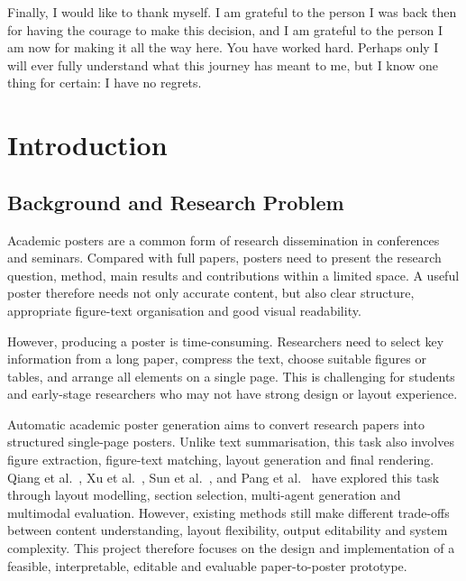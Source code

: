 \documentclass[12pt,oneside]{report}
\begin{document}
\vspace{1em}

Finally, I would like to thank myself. I am grateful to the person I was back then for having the courage to make this decision, and I am grateful to the person I am now for making it all the way here. You have worked hard. Perhaps only I will ever fully understand what this journey has meant to me, but I know one thing for certain: I have no regrets.


\clearpage{\pagestyle{empty}\cleardoublepage}
\tableofcontents

\clearpage{\pagestyle{empty}\cleardoublepage}
\setcounter{page}{1}
\fancyhead[LE,RO]{\slshape \rightmark}
\fancyhead[LO,RE]{\sffamily\textbf{\thepage}}

\chapter{Introduction}

\section{Background and Research Problem}

Academic posters are a common form of research dissemination in conferences and seminars. Compared with full papers, posters need to present the research question, method, main results and contributions within a limited space. A useful poster therefore needs not only accurate content, but also clear structure, appropriate figure-text organisation and good visual readability.

\vspace{1em}

However, producing a poster is time-consuming. Researchers need to select key information from a long paper, compress the text, choose suitable figures or tables, and arrange all elements on a single page. This is challenging for students and early-stage researchers who may not have strong design or layout experience.

\vspace{1em}

Automatic academic poster generation aims to convert research papers into structured single-page posters. Unlike text summarisation, this task also involves figure extraction, figure-text matching, layout generation and final rendering. Qiang et al.~\cite{poster2016}, Xu et al.~\cite{posterbot}, Sun et al.~\cite{p2p}, and Pang et al.~\cite{paper2poster} have explored this task through layout modelling, section selection, multi-agent generation and multimodal evaluation. However, existing methods still make different trade-offs between content understanding, layout flexibility, output editability and system complexity. This project therefore focuses on the design and implementation of a feasible, interpretable, editable and evaluable paper-to-poster prototype.
\end{document}

